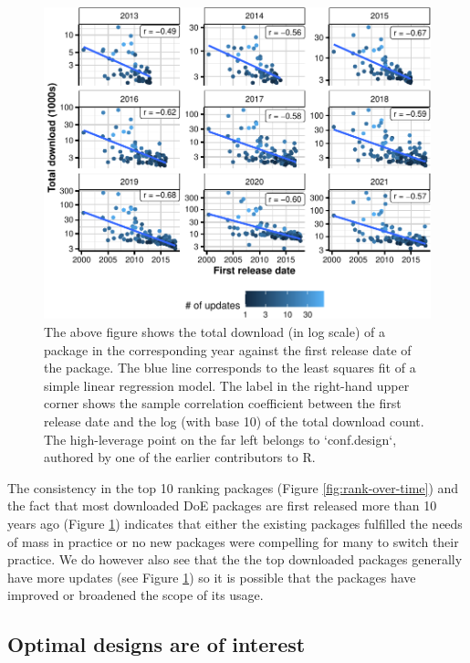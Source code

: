 \documentclass{article}
\begin{document}
\begin{figure}[htbp]

{\centering \includegraphics{figures/release-date-vs-download-1} 

}

\caption{The above figure shows the total download (in log scale) of a package in the corresponding year against the first release date of the package. The blue line corresponds to the least squares fit of a simple linear regression model. The label in the right-hand upper corner shows the sample correlation coefficient between the first release date and the log (with base 10) of the total download count. The high-leverage point on the far left belongs to `conf.design`, authored by one of the earlier contributors to R.}\label{fig:release-date-vs-download}
\end{figure}

The consistency in the top 10 ranking packages (Figure
\ref{fig:rank-over-time}) and the fact that most downloaded DoE packages
are first released more than 10 years ago (Figure
\ref{fig:release-date-vs-download}) indicates that either the existing
packages fulfilled the needs of mass in practice or no new packages were
compelling for many to switch their practice. We do however also see
that the the top downloaded packages generally have more updates (see
Figure \ref{fig:release-date-vs-download}) so it is possible that the
packages have improved or broadened the scope of its usage.

\hypertarget{topics}{%
\subsection{Optimal designs are of interest}\label{topics}}
\end{document}
